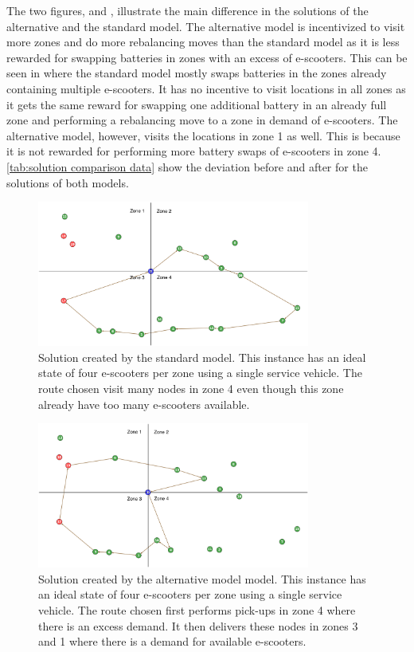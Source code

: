 The two figures,  and , illustrate the main difference in the solutions of the alternative and the standard model. The alternative model is incentivized to visit more zones and do more rebalancing moves than the standard model as it is less rewarded for swapping batteries in zones with an excess of e-scooters. This can be seen in  where the standard model mostly swaps batteries in the zones already containing multiple e-scooters. It has no incentive to visit locations in all zones as it gets the same reward for swapping one additional battery in an already full zone and performing a rebalancing move to a zone in demand of e-scooters. The alternative model, however, visits the locations in zone 1 as well. This is because it is not rewarded for performing more battery swaps of e-scooters in zone 4. \cref{tab:solution comparison data} show the deviation before and after for the solutions of both models. 
\\
\begin{figure}[H]
    \centering
    \includegraphics[width=0.8\textwidth]{Images/Computational Study/comp_S.png}
    \caption{Solution created by the standard model. This instance has an ideal state of four e-scooters per zone using a single service vehicle. The route chosen visit many nodes in zone 4 even though this zone already have too many e-scooters available.}
    \label{fig:comp_study_comp_models_A}
\end{figure}
\begin{figure}[H]
    \centering
    \includegraphics[width=0.8\textwidth]{Images/Computational Study/comp_A.png}
    \caption{Solution created by the alternative model model. This instance has an ideal state of four e-scooters per zone using a single service vehicle. The route chosen first performs pick-ups in zone 4 where there is an excess demand. It then delivers these nodes in zones 3 and 1 where there is a demand for available e-scooters.}
    \label{fig:comp_study_comp_models_S}
\end{figure}

